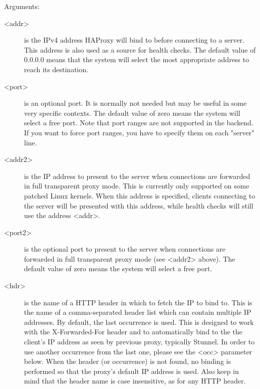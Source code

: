   Arguments:
  \begin{description}
  \item[<addr>] is the IPv4 address HAProxy will bind to before connecting to a
              server. This address is also used as a source for health checks.
              The default value of 0.0.0.0 means that the system will select
              the most appropriate address to reach its destination.

  \item[<port>] is an optional port. It is normally not needed but may be useful
              in some very specific contexts. The default value of zero means
              the system will select a free port. Note that port ranges are not
              supported in the backend. If you want to force port ranges, you
              have to specify them on each "server" line.

  \item[<addr2>] is the IP address to present to the server when connections are
              forwarded in full transparent proxy mode. This is currently only
              supported on some patched Linux kernels. When this address is
              specified, clients connecting to the server will be presented
              with this address, while health checks will still use the address
              <addr>.

  \item[<port2>] is the optional port to present to the server when connections
              are forwarded in full transparent proxy mode (see <addr2> above).
              The default value of zero means the system will select a free
              port.

  \item[<hdr>] is the name of a HTTP header in which to fetch the IP to bind to.
              This is the name of a comma-separated header list which can
              contain multiple IP addresses. By default, the last occurrence is
              used. This is designed to work with the X-Forwarded-For header
              and to automatically bind to the the client's IP address as seen
              by previous proxy, typically Stunnel. In order to use another
              occurrence from the last one, please see the <occ> parameter
              below. When the header (or occurrence) is not found, no binding
              is performed so that the proxy's default IP address is used. Also
              keep in mind that the header name is case insensitive, as for any
              HTTP header.


\end{description}
